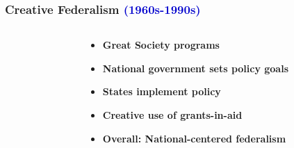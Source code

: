 \documentclass[10pt]{beamer}
\begin{document}
\begin{frame}
\frametitle{Creative Federalism \textcolor{mediumblue}{(1960s-1990s)}}

\begin{columns}
\begin{column}{0.4\textwidth}
\begin{center}
\end{center}
\end{column}

\begin{column}{0.6\textwidth}
\begin{itemize}
\item<1-> \textbf{Great Society programs}
\item<2-> \textbf{National government sets policy goals}
\item<3-> \textbf{States implement policy}
\item<4-> \textbf{Creative use of grants-in-aid}
\item<5-> \textbf{Overall: National-centered federalism}
\end{itemize}
\end{column}
\end{columns}

\end{frame}
\end{document}
